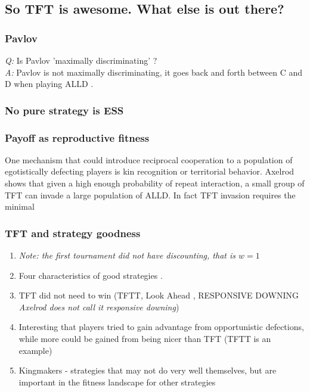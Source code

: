 \subsection{So TFT is awesome. What else is out there?}

\subsubsection{Pavlov}
\textit{Q:} Is Pavlov 'maximally discriminating' \cite[p.316]{RobertAxelrod_1981}?\\
\textit{A:} Pavlov is not maximally discriminating, it goes back and forth between C and D when playing ALLD \cite{Nowak1993}.

\subsubsection{No pure strategy is ESS}



\subsubsection{Payoff as reproductive fitness}
One mechanism that could introduce reciprocal cooperation to a population of egotistically defecting players is kin recognition or territorial behavior. Axelrod shows that given a high enough probability of repeat interaction, a small group of TFT can invade a large population of ALLD. In fact TFT invasion requires the minimal 


\subsubsection{TFT and strategy goodness}
\begin{enumerate}
\item \textit{Note: the first tournament did not have discounting, that is $w = 1$}
\item Four characteristics of good strategies \cite[p.110]{axelrod1984evolution}.
\item TFT did not need to win (TFTT, Look Ahead \cite[p.39]{axelrod1984evolution}, RESPONSIVE DOWNING \textit{Axelrod does not call it responsive downing})
\item Interesting that players tried to gain advantage from opportunistic defections, while more could be gained from being nicer than TFT (TFTT is an example)
\item Kingmakers - strategies that may not do very well themselves, but are important in the fitness landscape for other strategies
\end{enumerate}

